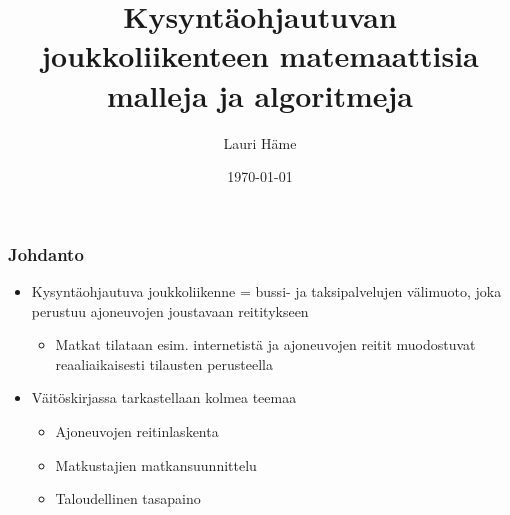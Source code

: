 \documentclass{beamer}
\title[Aalto-yliopiston perustieteiden korkeakoulu]{Kysyntäohjautuvan joukkoliikenteen matemaattisia malleja ja algoritmeja}
\author[L. Häme]{Lauri Häme}                 %
\institute[Aalto-yliopiston perustieteiden korkeakoulu]{Aalto-yliopiston perustieteiden korkeakoulu}      %
\date{\today}      %
\begin{document}
\begin{frame}
  \titlepage
\end{frame}


\begin{frame}
  \frametitle{Johdanto}   %
  \begin{itemize}
    \item 
Kysyntäohjautuva joukkoliikenne = bussi- ja taksipalvelujen välimuoto, joka perustuu ajoneuvojen joustavaan reititykseen
\begin{itemize}
 \item 
 Matkat tilataan esim. internetistä ja ajoneuvojen reitit muodostuvat reaaliaikaisesti tilausten perusteella
 \end{itemize}
 
  \item 
Väitöskirjassa tarkastellaan kolmea teemaa
 \begin{itemize}
\item
Ajoneuvojen reitinlaskenta
\item
Matkustajien matkansuunnittelu
\item
Taloudellinen tasapaino
\end{itemize}
 \end{itemize}

 
 
 
 
 
 
 
 
 
 
\end{frame}
\end{document}
